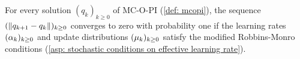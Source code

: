 \begin{lemma}
\label{thm: steps become arbitrarily small}
    For every solution $(q_k)_{k \ge 0}$ of MC-O-PI (\autoref{def: mcopi}),
    the sequence $( \|q_{{k+1}} - q_k\| )_{k \geq 0}$ converges to zero with probability one
    if the learning rates $(\alpha_k)_{k \geq 0}$ and update distributions $(\mu_k)_{k \geq 0}$ satisfy the modified Robbins-Monro conditions (\autoref{asp: stochastic conditions on effective learning rate}).
\end{lemma}
\vspace{-0.7cm}
